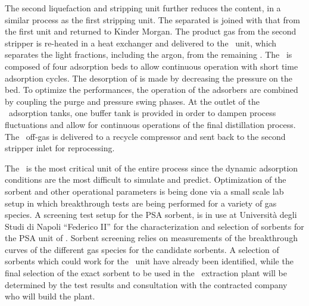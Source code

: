 The second liquefaction and stripping unit further reduces the  content, in a similar process as the first stripping unit. The separated  is joined with that from the first unit and returned to Kinder Morgan.  The product gas from the second stripper is re-heated in a heat exchanger and delivered to the \PSA\ unit, which separates the light fractions, including the argon, from the remaining .   The \PSA\ is composed of four adsorption beds to allow continuous operation with short time adsorption cycles.  The desorption of  is made by decreasing the pressure on the bed.  To optimize the performances, the operation of the adsorbers are combined by coupling the purge and pressure swing phases.  At the outlet of the \PSA\ adsorption tanks, one buffer tank is provided in order to dampen process fluctuations and allow for continuous operations of the final distillation process.  The \PSA\ off-gas is delivered to a recycle compressor and sent back to the second  stripper inlet for reprocessing.  

The \PSA\ is the most critical unit of the entire process since the dynamic adsorption conditions are the most difficult to simulate and predict.  Optimization of the sorbent and other operational parameters is being done via a small scale lab setup in which breakthrough tests are being performed for a variety of gas species. A screening test setup for the \Urania PSA sorbent, is in use at Universit\`a degli Studi di Napoli ``Federico II'' for the characterization and selection of sorbents for the PSA unit of \Urania. Sorbent screening relies on measurements of the breakthrough curves of the different gas species for the candidate sorbents.  A selection of sorbents which could work for the \PSA\ unit have already been identified, while the final selection of the exact sorbent to be used in the \UAr\ extraction plant will be determined by the test results and consultation with the contracted company who will build the plant.


